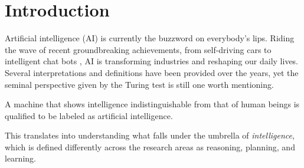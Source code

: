 \documentclass[a4paper,12pt,times,numbered,print,index]{Classes/PhDThesisPSnPDF}
\begin{document}
\frontmatter

% 
\newpage
% 

% 



\tableofcontents

\mainmatter
\sloppy
% 

\chapter{Introduction}

Artificial intelligence (AI) is currently the buzzword on everybody's lips.
Riding the wave of recent groundbreaking achievements, from self-driving cars \citep{} to intelligent chat bots \citep{}, AI is transforming industries and reshaping our daily lives.
Several interpretations and definitions have been provided over the years, yet the seminal perspective given by the Turing test \citep{turing1980computing} is still one worth mentioning. 
\begin{definition}
A machine that shows intelligence indistinguishable from that of human beings is qualified to be labeled as artificial intelligence.
\end{definition}
This translates into understanding what falls under the umbrella of \textit{intelligence}, which is defined differently across the research areas as reasoning, planning, and learning.
\end{document}
